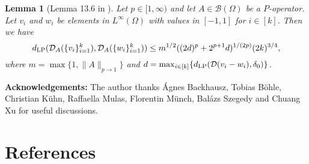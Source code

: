 \documentclass[11pt]{article}
\newtheorem{lemma}[theorem]{Lemma}
\begin{document}
\begin{lemma}[Lemma 13.6 in \cite{backhausz2018action}]\label{applem2} Let $p\in [1,\infty)$ and let $A\in\mathcal{B}(\Omega)$ be a $P$-operator. Let  $v_i$ and $w_i$ be elements in $L^\infty(\Omega)$ with values in $[-1,1]$ for $i\in [k]$. Then we have
$$d_{\rm LP}(\mathcal{D}_A(\{v_i\}_{i=1}^k),\mathcal{D}_A(\{w_i\}_{i=1}^k))\leq m^{1/2}((2d)^p+2^{p+1}d)^{1/(2p)}(2k)^{3/4},$$ where $m=\max\{1,\|A\|_{p\to 1}\}$ and $d=\max_{i\in [k]}\{d_{\rm LP}(\mathcal{D}(v_i-w_i),\delta_0)\}$.
\end{lemma}






\textbf{Acknowledgements:} The author thanks Ágnes Backhausz, Tobias B\"ohle, Christian K\"uhn, Raffaella Mulas, Florentin M\"unch, Balázs Szegedy and Chuang Xu for useful discussions.
\medskip


\section*{References}



\end{document}
